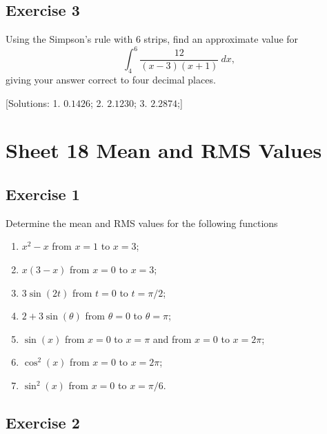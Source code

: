 \documentclass[
  english,
  11pt,
  oneside]{book}
\providecommand{\tightlist}{%
  \setlength{\itemsep}{0pt}\setlength{\parskip}{0pt}}
\newcommand{\slide}{}
\theoremstyle{definition}
\theoremstyle{definition}
\theoremstyle{definition}
\theoremstyle{definition}
\theoremstyle{remark}
\begin{document}
\slide

\subsection*{Exercise 3}\label{exercise-3-6}

Using the Simpson's rule with 6 strips, find an approximate value for
\[
\int_4^6\frac{12}{(x-3)(x+1)}\ dx,
\]
giving your answer correct to four decimal places.

{[}Solutions:
1. \(0.1426\);
2. \(2.1230\);
3. \(2.2874\);{]}

\slide

\section{Sheet 18 Mean and RMS Values}\label{sheet-18-mean-and-rms-values}

\slide

\subsection*{Exercise 1}\label{exercise-1-9}

Determine the mean and RMS values for the following functions

\begin{enumerate}
\def\labelenumi{\roman{enumi}.}
\tightlist
\item
  \(x^2-x\) from \(x=1\) to \(x=3\);
\item
  \(x(3-x)\) from \(x=0\) to \(x=3\);
\item
  \(3\sin(2t)\) from \(t=0\) to \(t=\pi/2\);
\item
  \(2+3\sin(\theta)\) from \(\theta=0\) to \(\theta=\pi\);
\item
  \(\sin(x)\) from \(x=0\) to \(x=\pi\) and from \(x=0\) to \(x=2\pi\);
\item
  \(\cos^2(x)\) from \(x=0\) to \(x=2\pi\);
\item
  \(\sin^2(x)\) from \(x=0\) to \(x=\pi/6\).
\end{enumerate}

\slide

\subsection*{Exercise 2}\label{exercise-2-9}
\end{document}

